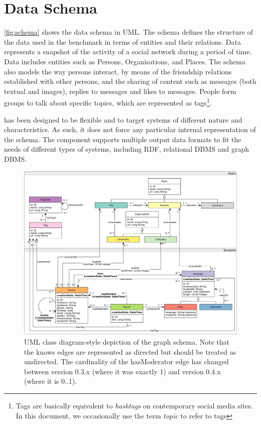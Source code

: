 \section{Data Schema}

\autoref{fig:schema} shows the data schema in UML. The schema defines the
structure of the data used in the benchmark in terms of entities and their
relations. Data represents a snapshot of the activity of a social network
during a period of time. Data includes entities such as Persons, Organisations,
and Places. The schema also models the way persons interact, by means of the
friendship relations established with other persons, and the sharing of content
such as messages (both textual and images), replies to messages and likes to
messages.  People form groups to talk about specific topics, which are
represented as tags\footnote{Tags are basically equivalent to \emph{hashtags}
on contemporary social media sites. In this document, we occasionally use the term
\emph{topic} to refer to tags}.

\ldbcsnb has been designed to be flexible and to target systems of different
nature and characteristics. As such, it does not force any particular internal
representation of the schema. The \datagen component
supports multiple output data formats to
fit the needs of different types of systems, including RDF, relational DBMS and
graph DBMS.

\begin{figure}[htbp]
    \centering
    \includegraphics[scale=\yedscale]{figures/schema-comfortable}
    \caption{UML class diagram-style depiction of the \ldbcsnb graph schema. Note that the \textsf{knows} edges are represented as directed but should be treated as undirected. The cardinality of the \textsf{hasModerator} edge has changed between version 0.3.x (where it was exactly 1) and version 0.4.x (where it is 0..1).}
    \label{fig:schema}
\end{figure}

